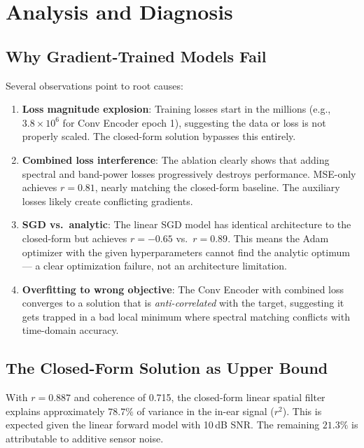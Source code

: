 \documentclass[11pt,a4paper]{article}
\begin{document}
\section{Analysis and Diagnosis}

\subsection{Why Gradient-Trained Models Fail}

Several observations point to root causes:

\begin{enumerate}
  \item \textbf{Loss magnitude explosion}: Training losses start in the millions
    (e.g., $3.8 \times 10^6$ for Conv Encoder epoch 1), suggesting the data
    or loss is not properly scaled. The closed-form solution bypasses this
    entirely.

  \item \textbf{Combined loss interference}: The ablation clearly shows that
    adding spectral and band-power losses progressively destroys performance.
    MSE-only achieves $r=0.81$, nearly matching the closed-form baseline.
    The auxiliary losses likely create conflicting gradients.

  \item \textbf{SGD vs.\ analytic}: The linear SGD model has identical architecture
    to the closed-form but achieves $r=-0.65$ vs.\ $r=0.89$. This means the
    Adam optimizer with the given hyperparameters cannot find the analytic
    optimum --- a clear optimization failure, not an architecture limitation.

  \item \textbf{Overfitting to wrong objective}: The Conv Encoder with combined
    loss converges to a solution that is \emph{anti-correlated} with the target,
    suggesting it gets trapped in a bad local minimum where spectral matching
    conflicts with time-domain accuracy.
\end{enumerate}

\subsection{The Closed-Form Solution as Upper Bound}

With $r=0.887$ and coherence of 0.715, the closed-form linear spatial filter
explains approximately $78.7\%$ of variance in the in-ear signal ($r^2$).
This is expected given the linear forward model with 10\,dB SNR. The remaining
$21.3\%$ is attributable to additive sensor noise.
\end{document}
